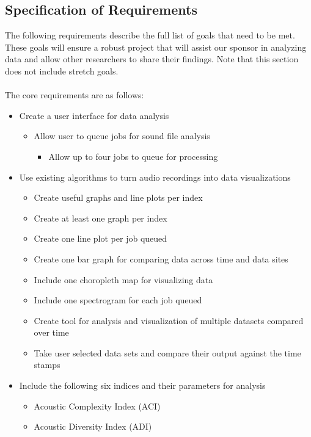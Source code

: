 \subsection{Specification of Requirements}
The following requirements describe the full list of goals that need to be met. These goals will ensure a robust project that will assist our sponsor in analyzing data and allow other researchers to share their findings. Note that this section does not include stretch goals.\\\\
The core requirements are as follows:
\begin{itemize}
  \item Create a user interface for data analysis
  \begin{itemize}
    \item Allow user to queue jobs for sound file analysis
    \begin{itemize}
      \item Allow up to four jobs to queue for processing
    \end{itemize}
  \end{itemize}
  \item Use existing algorithms to turn audio recordings into data visualizations
    \begin{itemize}
      \item Create useful graphs and line plots per index
      \item Create at least one graph per index
      \item Create one line plot per job queued
      \item Create one bar graph for comparing data across time and data sites
      \item Include one choropleth map for visualizing data
      \item Include one spectrogram for each job queued
      \item Create tool for analysis and visualization of multiple datasets compared over time
      \item Take user selected data sets and compare their output against the time stamps
    \end{itemize}
  \item Include the following six indices and their parameters for analysis
    \begin{itemize}
      \item Acoustic Complexity Index (ACI)
      \item Acoustic Diversity Index (ADI)

\end{itemize}
\end{itemize}
